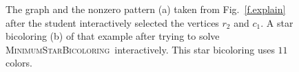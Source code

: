 \documentclass[12pt, oneside]{book}
\newcommand{\MinStaBic}{\textsc{MinimumStarBicoloring}}
\begin{document}
\begin{figure}[b]
\centering
{}
 \hfill
{}%
\caption{The graph and the nonzero pattern (a) taken from Fig.~\protect\ref{f.explain}
after the student interactively selected the vertices $r_2$
and $c_1$. A star bicoloring (b) of that example after trying to solve
\MinStaBic\ interactively. This star bicoloring uses $11$ colors.}
\label{f.arrow-shaped2}
\end{figure}
\end{document}

